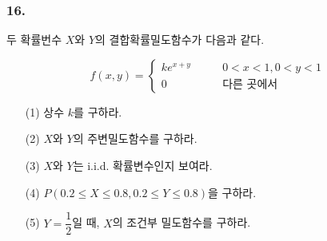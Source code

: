 \subsubsection{16.} 두 확률번수 $X$와 $Y$의 결합확률밀도함수가 다음과 같다.

\[f\left(x, y\right) = \left\{
\begin{array}{ll}
	ke^{x+y} & \qquad 0<x<1, 0<y<1 \\
	0 & \qquad\textrm{다른 곳에서}
\end{array}
\right. \]

\begin{itemize}
  \item [(1)] 상수 $k$를 구하라.
  \item [(2)] $X$와 $Y$의 주변밀도함수를 구하라.
  \item [(3)] $X$와 $Y$는 i.i.d. 확률변수인지 보여라.
  \item [(4)] $P\left(0.2\leq X\leq 0.8, 0.2\leq Y\leq 0.8\right)$을 구하라.
  \item [(5)] $Y=\dfrac{1}{2}$일 때, $X$의 조건부 밀도함수를 구하라.
\end{itemize}

